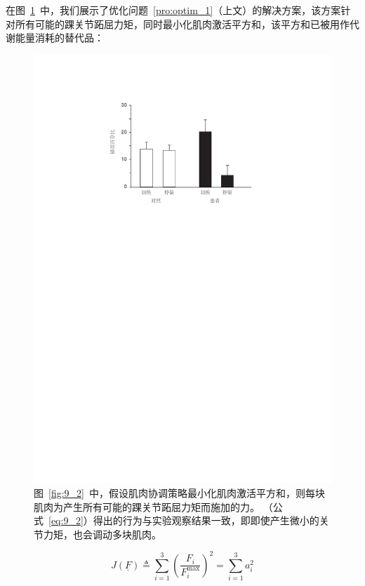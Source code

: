 在图~\ref{fig:9_5}~中，我们展示了优化问题~\ref{pro:optim_1}（上文）的解决方案，该方案针对所有可能的踝关节跖屈力矩，同时最小化肌肉激活平方和，该平方和已被用作代谢能量消耗的替代品：


\begin{figure}[!htb]
	\centering
	\includegraphics[width=1.0\linewidth]{chap9/9_5}
	\caption{图~\ref{fig:9_2}~中，假设肌肉协调策略最小化肌肉激活平方和，则每块肌肉为产生所有可能的踝关节跖屈力矩而施加的力。
		（公式~\ref{eq:9_2}）得出的行为与实验观察结果一致，即即使产生微小的关节力矩，也会调动多块肌肉。 \label{fig:9_5}}
\end{figure}

\begin{equation}
	J ( \underline{F} ) 
		\triangleq 
		\sum_{i=1}^{3}
			( \frac{F_i}{F_i^\text{max}} )^2
		= 
		\sum_{i=1}^{3} a_i^2
	\label{eq:9_2}
\end{equation}


